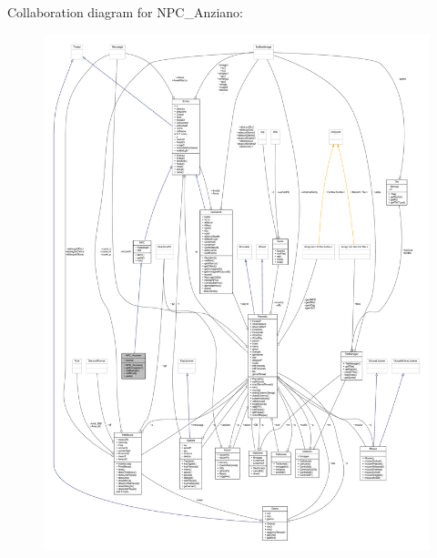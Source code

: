 Collaboration diagram for N\+P\+C\+\_\+\+Anziano\+:
\nopagebreak
\begin{figure}[H]
\begin{center}
\leavevmode
\includegraphics[width=350pt]{class_entita_1_1_n_p_c___anziano__coll__graph}
\end{center}
\end{figure}

